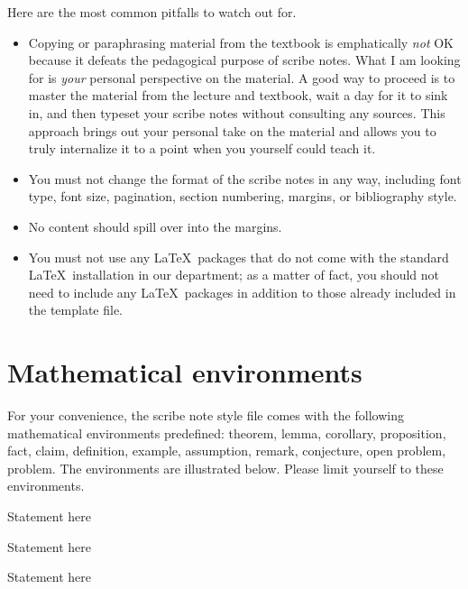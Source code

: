 \documentclass[usletter]{article}
\begin{document}
Here are the most common pitfalls to watch out for.

\begin{itemize}
\item Copying or paraphrasing material from the
textbook is emphatically \emph{not} OK because it
defeats the pedagogical purpose of scribe notes.  What
I am looking for is \emph{your} personal perspective on
the material. A good way to proceed is to master the
material from the lecture and textbook, wait a day
for it to sink in, and then typeset your scribe notes
without consulting any sources. This approach brings
out your personal take on the material and allows you
to truly internalize it to a point when you yourself
could teach it.

\item You must not change the format of the scribe
notes in any way, including font type, font size,
pagination, section numbering, margins, or bibliography
style. 

\item No content should spill over into the margins. 

\item You must not use any \LaTeX\ packages that do not
come with the standard \LaTeX\ installation in our
department; as a matter of fact, you should not need to
include any \LaTeX\ packages in addition to those
already included in the template file.
\end{itemize}


\section{Mathematical environments}

For your convenience, the scribe note style file comes
with the following mathematical environments
predefined: theorem, lemma, corollary, proposition,
fact, claim, definition, example, assumption, remark,
conjecture, open problem, problem. The environments are
illustrated below.  Please limit yourself to these
environments.

\begin{theorem}
Statement here 
\end{theorem}

\begin{lemma}
Statement here
\end{lemma}

\begin{corollary}
Statement here
\end{corollary}
\end{document}

